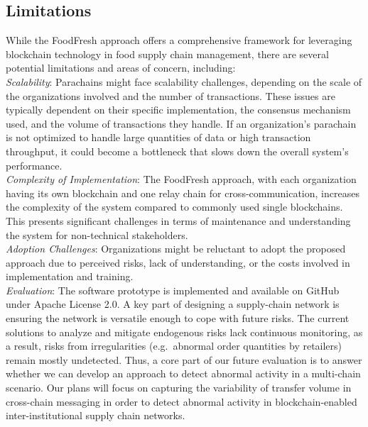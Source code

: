 \documentclass[conference,a4paper,flushend]{neutr}
\begin{document}
\subsection{Limitations} \label{s:limitations}
While the FoodFresh approach offers a comprehensive framework for leveraging blockchain technology in food supply chain management, there are several potential limitations and areas of concern, including:\\
\textit{Scalability}: Parachains might face scalability challenges, depending on the scale of the organizations involved and the number of transactions. These issues are typically dependent on their specific implementation, the consensus mechanism used, and the volume of transactions they handle. If an organization's parachain is not optimized to handle large quantities of data or high transaction throughput, it could become a bottleneck that slows down the overall system's performance.\\
\textit{Complexity of Implementation}: The FoodFresh approach, with each organization having its own blockchain and one relay chain for cross-communication, increases the complexity of the system compared to commonly used single blockchains. This presents significant challenges in terms of maintenance and understanding the system for non-technical stakeholders.\\
\textit{Adoption Challenges}: Organizations might be reluctant to adopt the proposed approach due to perceived risks, lack of understanding, or the costs involved in implementation and training. 
\\%
\textit{Evaluation}: The software prototype is implemented and available on GitHub
\cite{foodfreshRepo}
under Apache License 2.0.
%
A key part of designing a supply-chain network is ensuring the network is versatile enough to cope with future risks.
%
The current solutions to analyze and mitigate endogenous risks lack continuous monitoring, as a result, risks from irregularities (e.g.\ abnormal order quantities by retailers) remain mostly undetected.
%
Thus, a core part of our future evaluation is to answer whether we can develop an approach to detect abnormal activity in a multi-chain scenario.
%
Our plans will focus on capturing the variability of transfer volume in cross-chain messaging in order to detect abnormal activity in blockchain-enabled inter-institutional supply chain networks. 
\end{document}
